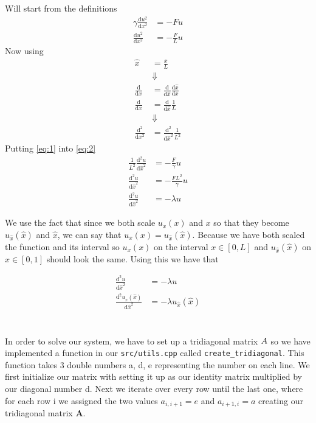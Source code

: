\documentclass[a4paper,10pt,english]{article}
\newcommand{\dd}[1]{\mathrm{d}#1}
\begin{document}
			\section{} %
				Will start from the definitions
				\begin{align}
				  \gamma \frac{\dd{u^{2}}}{\dd{x^{2}}} &= -Fu\\
				  \frac{\dd{u^{2}}}{\dd{x^{2}}}&= - \frac{F}{L}u \label{eq:2}
				\end{align}
				Now using
				\begin{align}
				  \hat{x} &= \frac{x}{L}\\
						  &\Downarrow\nonumber\\
				  \frac{\dd{}}{\dd{x}} &= \frac{\dd{}}{\dd{\hat{x}}}\frac{\dd{\hat{x}}}{\dd{x}}\\
						  \frac{\dd{}}{\dd{x}} &= \frac{\dd{}}{\dd{\hat{x}}} \frac{1}{L}\\
				  &\Downarrow\nonumber\\
				  \frac{\dd{^{2}}}{\dd{x^{2}}} &= \frac{\dd{^{2}}}{\dd{\hat{x}^{2}}}\frac{1}{L^{2}}\label{eq:1}
				\end{align}
				Putting \eqref{eq:1} into \eqref{eq:2}
				\begin{align}
				  \frac{1}{L^{2}}\frac{\dd{^{2}u}}{\dd{\hat{x}^{2}}} &= - \frac{F}{\gamma}u\\
				  \frac{\dd{^{2}u}}{\dd{\hat{x}^{2}}} &= -\frac{FL^{2}}{\gamma} u\\
				  \frac{\dd{^{2}u}}{\dd{\hat{x}^{2}}} &= -\lambda u
				\end{align}
				
We use the fact that since we both scale $u_x(x)$ and
$x$ so that they become $u_{\hat{x}}(\hat{x})$ and $\hat{x}$, we can say that $u_x(x) = u_{\hat{x}}
(\hat{x})$. Because we have both scaled the function
and its interval so $u_x(x)$ on the interval $x \in
[0, L]$ and $u_{\hat{x}}(\hat{x})$ on $\hat{x} \in
[0, 1]$ should look the same. Using this we have that 

\begin{align}
	\frac{\dd{^{2}u}}{\dd{\hat{x}^{2}}} &= -\lambda u \\
	\frac{\dd{^{2} u_{\hat{x}}(\hat{x})}}{\dd{\hat{x}^{2}}} 
	&= - \lambda u_{\hat{x}}(\hat{x})
\end{align}

			\section{} %
			In order to solve our system, we have to set up a tridiagonal matrix $\boldmath{A}$
			so we have implemented a function in our \lstinline{src/utils.cpp}
called \lstinline{create_tridiagonal}.  This function takes 3 double numbers a,
d, e representing the number on each line. We first initialize our matrix with
setting it up as our identity matrix multiplied by our diagonal number d. Next
we iterate over every row until the last one, where for each row i we assigned
the two values
			$a_{i, i+1} = e$ and $a_{i+1, i} = a$ creating our tridiagonal matrix $\boldsymbol{A}$.\\
			
\end{document}
